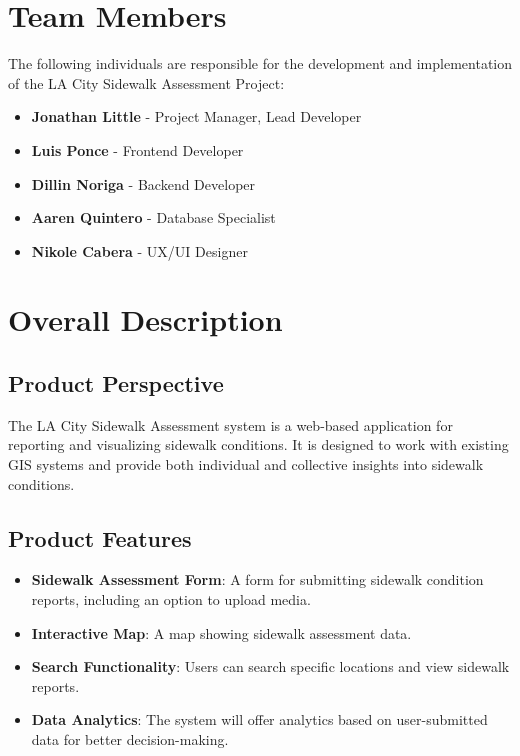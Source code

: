 \documentclass[a4paper,12pt]{article}
\begin{document}
\newpage
\section{Team Members}
The following individuals are responsible for the development and implementation of the LA City Sidewalk Assessment Project:

\begin{itemize}
    \item \textbf{Jonathan Little} - Project Manager, Lead Developer
    \item \textbf{Luis Ponce} - Frontend Developer
    \item \textbf{Dillin Noriga} - Backend Developer
    \item \textbf{Aaren Quintero} - Database Specialist
    \item \textbf{Nikole Cabera} - UX/UI Designer
\end{itemize}

\newpage
\section{Overall Description}

\subsection{Product Perspective}
The LA City Sidewalk Assessment system is a web-based application for reporting and visualizing sidewalk conditions. It is designed to work with existing GIS systems and provide both individual and collective insights into sidewalk conditions.

\subsection{Product Features}
\begin{itemize}
    \item \textbf{Sidewalk Assessment Form}: A form for submitting sidewalk condition reports, including an option to upload media.
    \item \textbf{Interactive Map}: A map showing sidewalk assessment data.
    \item \textbf{Search Functionality}: Users can search specific locations and view sidewalk reports.
    \item \textbf{Data Analytics}: The system will offer analytics based on user-submitted data for better decision-making.
\end{itemize}
\end{document}
